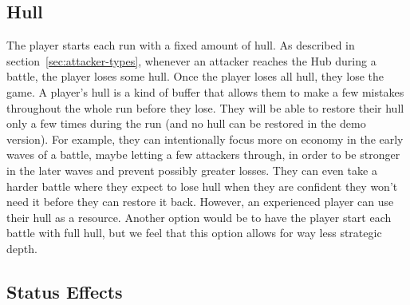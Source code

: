 \subsection{Hull}\label{sec:design-hull}

The player starts each run with a fixed amount of hull.
As described in section~\ref{sec:attacker-types}, whenever an attacker reaches the Hub during a battle, the player loses some hull.
Once the player loses all hull, they lose the game.
A player's hull is a kind of buffer that allows them to make a few mistakes throughout the whole run before they lose.
They will be able to restore their hull only a few times during the run (and no hull can be restored in the demo version).
For example, they can intentionally focus more on economy in the early waves of a battle, maybe letting a few attackers through, in order to be stronger in the later waves and prevent possibly greater losses.
They can even take a harder battle where they expect to lose hull when they are confident they won't need it before they can restore it back.
However, an experienced player can use their hull as a resource.
Another option would be to have the player start each battle with full hull, but we feel that this option allows for way less strategic depth.

\subsection{Status Effects}

